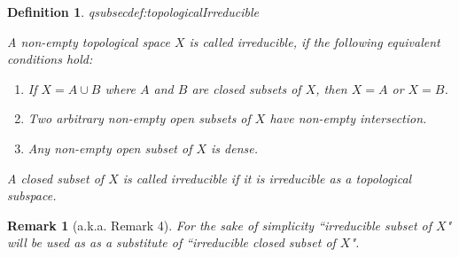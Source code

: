 \documentclass[DIV=14,parskip=full,pointednumbers]{scrartcl}
\newenvironment{alphanumerate}{\begin{enumerate}[label={$(\alph*)$},ref=\curthm]}{\end{enumerate}}
\theoremstyle{cthm}
\theoremstyle{cvarthm}
\theoremstyle{cdef}
\newtheorem{defi}{Definition}[subsection]
\newtheorem{rem}{Remark}[subsection]
\newcommand{\lbl}[1]{
	\label{#1}
	\ifmmode
	\expandafter\xdef\csname eqsubsec#1\endcsname{\thesubsection}
	\fi
}
\begin{document}
	\begin{defi}\lbl{def:topologicalIrreducible}
		A non-empty topological space $X$ is called \emph{irreducible},  if the following equivalent conditions hold:
		\begin{alphanumerate}
			\item If $X=A\cup B$ where $A$ and $B$ are closed subsets of $X$, then $X=A$ or $X=B$. 
			\item Two arbitrary non-empty open subsets of $X$ have non-empty intersection.
			\item Any non-empty open subset of $X$ is dense.
		\end{alphanumerate}
		A closed subset of $X$ is called irreducible if it is irreducible as a topological subspace.
	\end{defi}
	\begin{rem}[a.k.a. Remark 4]
		For the sake of simplicity ``irreducible subset of $X$" will be used as as a substitute of ``irreducible closed subset of $X$".
	\end{rem}
	
\end{document}
